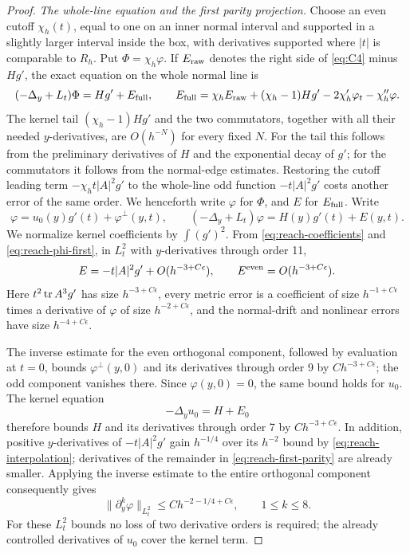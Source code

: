 \begin{proof}
\emph{The whole-line equation and the first parity projection.}
Choose an even cutoff $\chi_h(t)$, equal to one on an inner normal
interval and supported in a slightly larger interval inside the box,
with derivatives supported where $|t|$ is comparable to $R_h$.  Put
$\Phi=\chi_h\varphi$.  If $E_{\rm raw}$ denotes the right side of
\eqref{eq:C4} minus $Hg'$, the exact equation on the whole normal line is
\[
 (-\Delta_y+L_t)\Phi=Hg'+E_{\rm full},\qquad
 E_{\rm full}=\chi_h E_{\rm raw}+(\chi_h-1)Hg'
                  -2\chi_h'\varphi_t-\chi_h''\varphi.
\]
The kernel tail $(\chi_h-1)Hg'$ and the two commutators, together with
all their needed $y$-derivatives, are $O(h^{-N})$ for every fixed $N$.
For the tail this follows from the preliminary derivatives of $H$ and
the exponential decay of $g'$; for the commutators it follows from the
normal-edge estimates.  Restoring the cutoff leading term
$-\chi_h t|A|^2g'$ to the whole-line odd function $-t|A|^2g'$ costs
another error of the same order.  We henceforth write $\varphi$ for
$\Phi$, and $E$ for $E_{\rm full}$.  Write
\[
 \varphi=u_0(y)g'(t)+\varphi^\perp(y,t),\qquad
 (-\Delta_y+L_t)\varphi=H(y)g'(t)+E(y,t).
\]
We normalize kernel coefficients by $\int(g')^2$.
From \eqref{eq:reach-coefficients} and \eqref{eq:reach-phi-first},
in $L_t^2$ with $y$-derivatives through order 11,
\begin{equation}\label{eq:reach-first-parity}
 E=-t|A|^2g'+O(h^{-3+C\epsilon}),\qquad
 E^{\rm even}=O(h^{-3+C\epsilon}).
\end{equation}
Here $t^2\operatorname{tr} A^3g'$ has size $h^{-3+C\epsilon}$, every metric
error is a coefficient of size $h^{-1+C\epsilon}$ times a derivative
of $\varphi$ of size $h^{-2+C\epsilon}$, and the normal-drift and
nonlinear errors have size $h^{-4+C\epsilon}$.

The inverse estimate for the even orthogonal component, followed by
evaluation at $t=0$, bounds $\varphi^\perp(y,0)$ and its derivatives
through order 9 by $C h^{-3+C\epsilon}$; the odd component vanishes
there.  Since $\varphi(y,0)=0$, the same bound holds for $u_0$.
The kernel equation
\begin{equation}\label{eq:reach-kernel}
 -\Delta_yu_0=H+E_0
\end{equation}
therefore bounds $H$ and its derivatives through order 7 by
$C h^{-3+C\epsilon}$.  In addition, positive $y$-derivatives of
$-t|A|^2g'$ gain $h^{-1/4}$ over its $h^{-2}$ bound by
\eqref{eq:reach-interpolation}; derivatives of the remainder in
\eqref{eq:reach-first-parity} are already smaller.  Applying the
inverse estimate to the entire orthogonal component consequently gives
\begin{equation}\label{eq:reach-positive-phi}
 \|\partial_y^k\varphi\|_{L_t^2}
 \le C h^{-2-1/4+C\epsilon},\qquad1\le k\le8.
\end{equation}
For these $L_t^2$ bounds no loss of two derivative orders is required;
the already controlled derivatives of $u_0$ cover the kernel term.


\end{proof}
